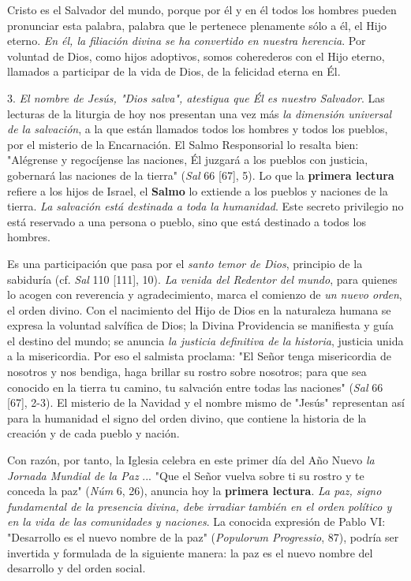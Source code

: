 \begin{body}
Cristo es el Salvador del mundo, porque por él y en él todos los hombres pueden pronunciar esta palabra, palabra que le pertenece plenamente sólo a él, el Hijo eterno. \emph{En él, la filiación divina se ha convertido en nuestra herencia}. Por voluntad de Dios, como hijos adoptivos, somos coherederos con el Hijo eterno, llamados a participar de la vida de Dios, de la felicidad eterna en Él.

3. \emph{El nombre de Jesús, "Dios salva", atestigua que Él es nuestro Salvador}. Las lecturas de la liturgia de hoy nos presentan una vez más \emph{la dimensión universal de la salvación}, a la que están llamados todos los hombres y todos los pueblos, por el misterio de la Encarnación. El Salmo Responsorial lo resalta bien: "Alégrense y regocíjense las naciones, Él juzgará a los pueblos con justicia, gobernará las naciones de la tierra" (\emph{Sal} 66 {[}67{]}, 5). Lo que la \textbf{primera lectura} refiere a los hijos de Israel, el \textbf{Salmo} lo extiende a los pueblos y naciones de la tierra. \emph{La salvación está destinada a toda la humanidad}. Este secreto privilegio no está reservado a una persona o pueblo, sino que está destinado a todos los hombres.

Es una participación que pasa por el \emph{santo temor de Dios}, principio de la sabiduría (cf. \emph{Sal} 110 {[}111{]}, 10). \emph{La venida del Redentor del mundo}, para quienes lo acogen con reverencia y agradecimiento, marca el comienzo de \emph{un nuevo orden}, el orden divino. Con el nacimiento del Hijo de Dios en la naturaleza humana se expresa la voluntad salvífica de Dios; la Divina Providencia se manifiesta y guía el destino del mundo; se anuncia \emph{la justicia definitiva de la historia}, justicia unida a la misericordia. Por eso el salmista proclama: "El Señor tenga misericordia de nosotros y nos bendiga, haga brillar su rostro sobre nosotros; para que sea conocido en la tierra tu camino, tu salvación entre todas las naciones" (\emph{Sal} 66 {[}67{]}, 2-3). El misterio de la Navidad y el nombre mismo de "Jesús" representan así para la humanidad el signo del orden divino, que contiene la historia de la creación y de cada pueblo y nación.

Con razón, por tanto, la Iglesia celebra en este primer día del Año Nuevo \emph{la Jornada Mundial de la Paz} ... "Que el Señor vuelva sobre ti su rostro y te conceda la paz" (\emph{Núm} 6, 26), anuncia hoy la \textbf{primera lectura}. \emph{La paz, signo fundamental de la presencia divina, debe irradiar también en el orden político y en la vida de las comunidades y naciones}. La conocida expresión de Pablo VI: "Desarrollo es el nuevo nombre de la paz" (\emph{Populorum Progressio}, 87), podría ser invertida y formulada de la siguiente manera: la paz es el nuevo nombre del desarrollo y del orden social.


\end{body}
